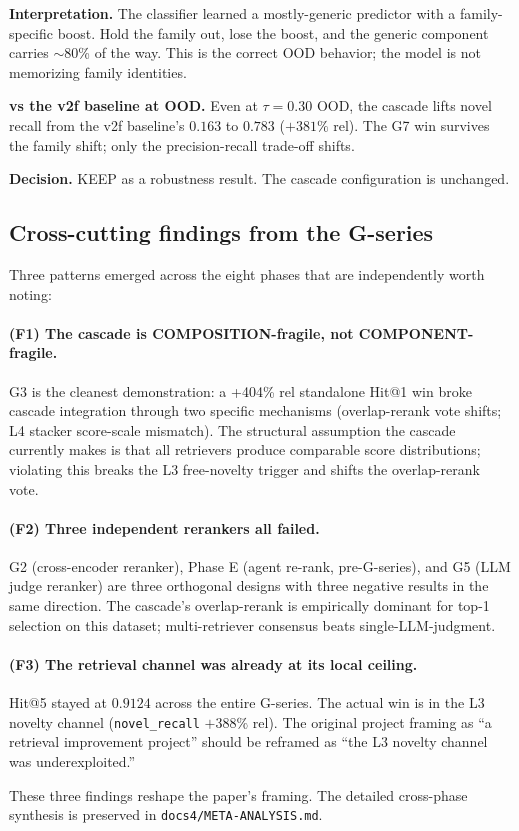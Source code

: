 \textbf{Interpretation.} The classifier learned a mostly-generic predictor with a family-specific boost. Hold the family out, lose the boost, and the generic component carries $\sim$80\% of the way. This is the correct OOD behavior; the model is not memorizing family identities.

\textbf{vs the v2f baseline at OOD.} Even at $\tau = 0.30$ OOD, the cascade lifts novel recall from the v2f baseline's $0.163$ to $0.783$ ($+381\%$ rel). The G7 win survives the family shift; only the precision-recall trade-off shifts.

\textbf{Decision.} KEEP as a robustness result. The cascade configuration is unchanged.

\subsection{Cross-cutting findings from the G-series}

Three patterns emerged across the eight phases that are independently worth noting:

\paragraph{(F1) The cascade is COMPOSITION-fragile, not COMPONENT-fragile.}
G3 is the cleanest demonstration: a +404\% rel standalone Hit@1 win broke cascade integration through two specific mechanisms (overlap-rerank vote shifts; L4 stacker score-scale mismatch). The structural assumption the cascade currently makes is that all retrievers produce comparable score distributions; violating this breaks the L3 free-novelty trigger and shifts the overlap-rerank vote.

\paragraph{(F2) Three independent rerankers all failed.}
G2 (cross-encoder reranker), Phase E (agent re-rank, pre-G-series), and G5 (LLM judge reranker) are three orthogonal designs with three negative results in the same direction. The cascade's overlap-rerank is empirically dominant for top-1 selection on this dataset; multi-retriever consensus beats single-LLM-judgment.

\paragraph{(F3) The retrieval channel was already at its local ceiling.}
Hit@5 stayed at $0.9124$ across the entire G-series. The actual win is in the L3 novelty channel (\texttt{novel\_recall} $+388\%$ rel). The original project framing as ``a retrieval improvement project'' should be reframed as ``the L3 novelty channel was underexploited.''

These three findings reshape the paper's framing. The detailed cross-phase synthesis is preserved in \texttt{docs4/META-ANALYSIS.md}.

